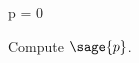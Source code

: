 \documentclass{ximera}
\author{Jim Fowler}
\begin{document}
\begin{sagesilent}
  p = 0
\end{sagesilent}

\begin{exercise}

  Compute $\sage{p}$.


  
\end{exercise}
\end{document}
